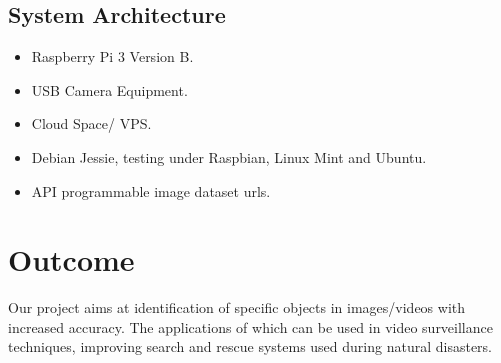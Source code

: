 \documentclass{article}
\begin{document}
\subsection{System Architecture}

\begin{itemize}
  \item Raspberry Pi 3 Version B.
  \item USB Camera Equipment.
  \item Cloud Space/ VPS.
  \item Debian Jessie, testing under Raspbian, Linux Mint and Ubuntu.
  \item API programmable image dataset urls.
\end{itemize}

\section{Outcome}

Our project aims at identification of specific objects in images/videos with increased accuracy. The applications of which can be used in video surveillance techniques, improving search and rescue systems used during natural disasters.

\newpage

 
 
\end{document}
